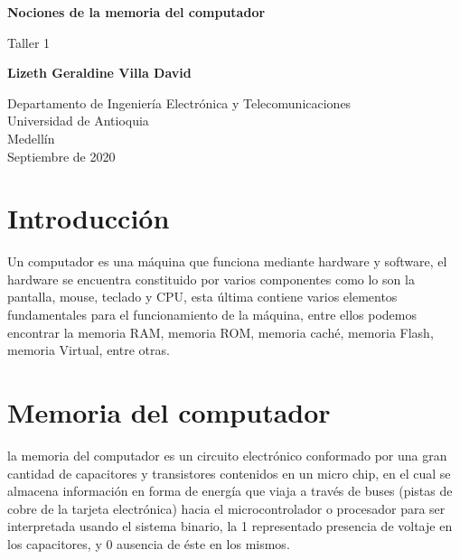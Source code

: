 \documentclass{article}
\begin{document}
\begin{titlepage}
    \begin{center}
        \vspace*{1cm}
            
        \Huge
        \textbf{Nociones de la memoria del computador}
            
        \vspace{0.5cm}
        \LARGE
        Taller 1
            
        \vspace{1.5cm}
            
        \textbf{Lizeth Geraldine Villa David}
            
        \vfill
            
        \vspace{0.8cm}
            
        \Large
        Departamento de Ingeniería Electrónica y Telecomunicaciones\\
        Universidad de Antioquia\\
        Medellín\\
        Septiembre de 2020
            
    \end{center}
\end{titlepage}

\tableofcontents

\section{Introducción}\label{contenido}


Un computador es una máquina que funciona mediante hardware y software, 
el hardware se encuentra constituido por varios componentes
como lo son la pantalla, mouse, teclado y CPU, esta última contiene varios 
elementos fundamentales para el funcionamiento de la máquina, 
entre ellos podemos encontrar la memoria RAM, memoria ROM, memoria caché, 
memoria Flash, memoria Virtual, entre otras. 

\section{Memoria del computador}\label{contenido}

la memoria del computador es un circuito electrónico conformado por una gran cantidad de 
capacitores y transistores contenidos en un micro chip, en el cual se almacena información en forma de energía que viaja a través de buses (pistas de cobre de la tarjeta electrónica) hacia el microcontrolador o procesador para ser interpretada usando el sistema binario, la 1 representado presencia de voltaje en los capacitores, y 0 ausencia de éste en los mismos.
\end{document}
